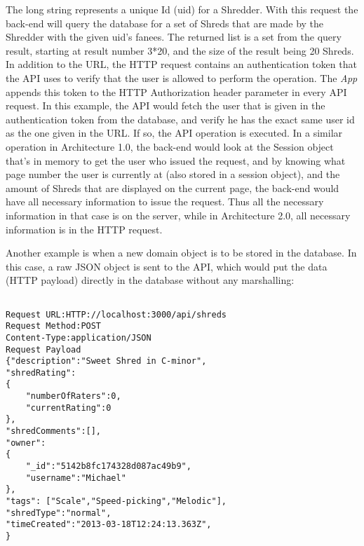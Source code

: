 The long string represents a unique Id (uid) for a Shredder. With this request the back-end will query the database for a set of Shreds that are made by the Shredder with the given uid's fanees. The returned list is a set from the query result, starting at result number 3*20, and the size of the result being 20 Shreds. In addition to the URL, the HTTP request contains an authentication token that the API uses to verify that the user is allowed to perform the operation. The \textit{App} appends this token to the HTTP Authorization header parameter in every API request. In this example, the API would fetch the user that is given in the authentication token from the database, and verify he has the exact same user id as the one given in the URL. If so, the API operation is executed. In a similar operation in Architecture 1.0, the back-end would look at the Session object that's in memory to get the user who issued the request, and by knowing what page number the user is currently at (also stored in a session object), and the amount of Shreds that are displayed on the current page, the back-end would have all necessary information to issue the request. Thus all the necessary information in that case is on the server, while in Architecture 2.0, all necessary information is in the HTTP request. 

Another example is when a new domain object is to be stored in the database. In this case, a raw JSON object is sent to the API, which would put the data (HTTP payload) directly in the database without any marshalling:
\begin{lstlisting}

Request URL:HTTP://localhost:3000/api/shreds
Request Method:POST
Content-Type:application/JSON
Request Payload
{"description":"Sweet Shred in C-minor",
"shredRating":
{
	"numberOfRaters":0,
	"currentRating":0
},
"shredComments":[],
"owner":
{
	"_id":"5142b8fc174328d087ac49b9",
	"username":"Michael"
},
"tags": ["Scale","Speed-picking","Melodic"],
"shredType":"normal",
"timeCreated":"2013-03-18T12:24:13.363Z",
}
\end{lstlisting}

